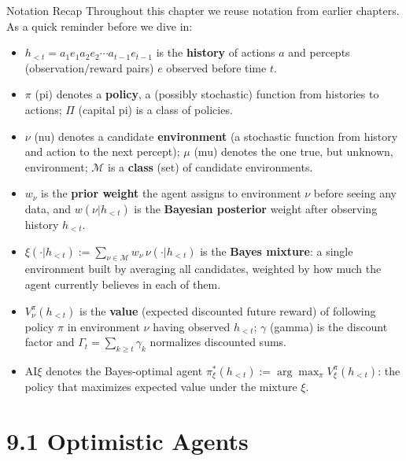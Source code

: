 \documentclass[aspectratio=169,10pt]{beamer}
\begin{document}
\begin{frame}{Notation Recap}
  Throughout this chapter we reuse notation from earlier chapters. As a
  quick reminder before we dive in:
  \begin{itemize}
    \item $h_{<t} = a_1e_1a_2e_2\cdots a_{t-1}e_{t-1}$ is the
      \textbf{history} of actions $a$ and percepts (observation/reward
      pairs) $e$ observed before time $t$.
    \item $\pi$ (pi) denotes a \textbf{policy}, a (possibly stochastic)
      function from histories to actions; $\Pi$ (capital pi) is a class of
      policies.
    \item $\nu$ (nu) denotes a candidate \textbf{environment} (a stochastic
      function from history and action to the next percept); $\mu$ (mu)
      denotes the one true, but unknown, environment; $\mathcal{M}$ is a
      \textbf{class} (set) of candidate environments.
    \item $w_\nu$ is the \textbf{prior weight} the agent assigns to
      environment $\nu$ before seeing any data, and $w(\nu|h_{<t})$ is the
      \textbf{Bayesian posterior} weight after observing history $h_{<t}$.
    \item $\xi(\cdot|h_{<t}) := \sum_{\nu\in\mathcal{M}} w_\nu\,\nu(\cdot|h_{<t})$
      is the \textbf{Bayes mixture}: a single environment built by averaging
      all candidates, weighted by how much the agent currently believes in
      each of them.
    \item $V^\pi_\nu(h_{<t})$ is the \textbf{value} (expected discounted
      future reward) of following policy $\pi$ in environment $\nu$ having
      observed $h_{<t}$; $\gamma$ (gamma) is the discount factor and
      $\Gamma_t=\sum_{k\ge t}\gamma_k$ normalizes discounted sums.
    \item $\mathrm{AI}\xi$ denotes the Bayes-optimal agent
      $\pi^*_\xi(h_{<t}) := \arg\max_\pi V^\pi_\xi(h_{<t})$: the policy that
      maximizes expected value under the mixture $\xi$.
  \end{itemize}
\end{frame}

\section{9.1 Optimistic Agents}
\end{document}

